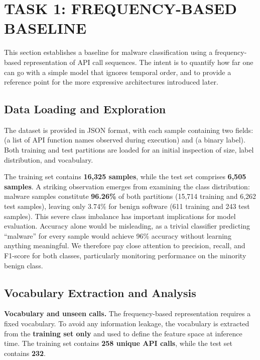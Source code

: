
\section{TASK 1: FREQUENCY-BASED BASELINE} \label{sec:task1}

This section establishes a baseline for malware classification using a frequency-based representation of API call sequences. The intent is to quantify how far one can go with a simple model that ignores temporal order, and to provide a reference point for the more expressive architectures introduced later.

\subsection{Data Loading and Exploration} \label{subsec:task1_data}

The dataset is provided in JSON format, with each sample containing two fields:  (a list of API function names observed during execution) and  (a binary label). Both training and test partitions are loaded for an initial inspection of size, label distribution, and vocabulary.

The training set contains \textbf{16,325 samples}, while the test set comprises \textbf{6,505 samples}. A striking observation emerges from examining the class distribution: malware samples constitute \textbf{96.26\%} of both partitions (15,714 training and 6,262 test samples), leaving only 3.74\% for benign software (611 training and 243 test samples). This severe class imbalance has important implications for model evaluation. Accuracy alone would be misleading, as a trivial classifier predicting ``malware'' for every sample would achieve 96\% accuracy without learning anything meaningful. We therefore pay close attention to precision, recall, and F1-score for both classes, particularly monitoring performance on the minority benign class.

\subsection{Vocabulary Extraction and Analysis} \label{subsec:task1_vocab}

\textbf{Vocabulary and unseen calls.} The frequency-based representation requires a fixed vocabulary. To avoid any information leakage, the vocabulary is extracted from the \textbf{training set only} and used to define the feature space at inference time. The training set contains \textbf{258 unique API calls}, while the test set contains \textbf{232}.

